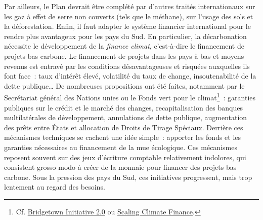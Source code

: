 \documentclass[a5paper,french]{memoir}
\begin{document}
Par ailleurs, le Plan devrait être complété par d'autres traités internationaux sur les gaz à effet de serre non couverts (tels que le méthane), sur l'usage des sols et la déforestation. 
Enfin, il faut adapter le système financier international pour le rendre plus avantageux pour les pays du Sud. En particulier, la décarbonation nécessite le développement de la \textit{finance climat}, c'est-à-dire le financement de projets bas carbone. Le financement de projets dans les pays à bas et moyens revenus est entravé par les conditions désavantageuses et risquées auxquelles ils font face~: taux d'intérêt élevé, volatilité du taux de change, insoutenabilité de la dette publique\dots{} De nombreuses propositions ont été faites, notamment par le Secrétariat général des Nations unies ou le Fonds vert pour le climat\footnote{Cf. \href{https://www.un.org/sustainabledevelopment/blog/2023/04/press-release-with-clock-ticking-for-the-sdgs-un-chief-and-barbados-prime-minister-call-for-urgent-action-to-transform-broken-global-financial-system/}{Bridgetown Initiative 2.0} ou \href{https://www.greenclimate.fund/sites/default/files/document/scaling-climate-finance-context-covid-19-full-report\_0.pdf}{Scaling Climate Finance}.}~: garanties publiques sur le crédit et le marché des changes, recapitalisation des banques multilatérales de développement, annulations de dette publique, augmentation des prêts entre États et allocation de Droits de Tirage Spéciaux. Derrière ces mécanismes techniques se cachent une idée simple~: apporter les fonds et les garanties nécessaires au financement de la mue écologique. Ces mécanismes reposent souvent sur des jeux d'écriture comptable relativement indolores, qui consistent grosso modo à créer de la monnaie pour financer des projets bas carbone. Sous la pression des pays du Sud, ces initiatives progressent, mais trop lentement au regard des besoins.

\end{document}
